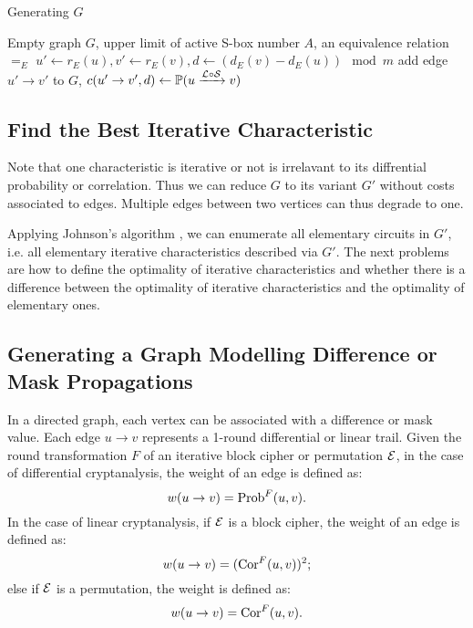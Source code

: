 \begin{algorithm}
	\caption{Generating $G$}
	\label{algo:gen_G}
	\begin{algorithmic}[1]
		\Require Empty graph $G$, upper limit of active S-box number $A$, an equivalence relation $=_E$
		\Procedure {}{}
		\State $u'\leftarrow r_E(u),v'\leftarrow r_E(v),d\leftarrow (d_E(v)-d_E(u))\mod m$
		\State add edge $u'\rightarrow v'$ to $G$, $c(u'\rightarrow v',d)\leftarrow \mathbb{P}(u\xrightarrow{\mathcal{L}\circ\mathcal{S}}v)$
		\EndFor
		\EndIf
		\EndFor
		\EndProcedure
	\end{algorithmic}
\end{algorithm}

\subsection{Find the Best Iterative Characteristic}

Note that one characteristic is iterative or not is irrelavant to its diffrential probability or correlation. Thus we can reduce $G$ to its variant $G'$ without costs associated to edges. Multiple edges between two vertices can thus degrade to one. 

Applying Johnson's algorithm \cite{johnson1975finding}, we can enumerate all elementary circuits in $G'$, i.e. all elementary iterative characteristics described via $G'$. The next problems are how to define the optimality of iterative characteristics and whether there is a difference between the optimality of iterative characteristics and the optimality of elementary ones. 

\subsection{Generating a Graph Modelling Difference or Mask Propagations}

In a directed graph, each vertex can be associated with a difference or mask value. Each edge $u\rightarrow v$ represents a 1-round differential or linear trail. Given the round transformation $F$ of an iterative block cipher or permutation $\mathcal{E}$, in the case of differential cryptanalysis, the weight of an edge is defined as:
\[
    w(u\rightarrow v)=\text{Prob}^{F}(u,v).
\]
In the case of linear cryptanalysis, if $\mathcal{E}$ is a block cipher, the weight of an edge is defined as:
\[
    w(u\rightarrow v)=(\text{Cor}^{F}(u,v))^2;
\]
else if $\mathcal{E}$ is a permutation, the weight is defined as:
\[
    w(u\rightarrow v)=\text{Cor}^{F}(u,v).
\]

